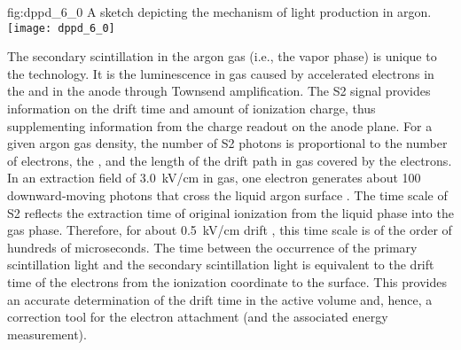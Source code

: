 \begin{dunefigure}{fig:dppd_6_0}
{A sketch depicting the mechanism of light production in argon.}
\texttt{[image: dppd\_6\_0]}
\end{dunefigure}

The secondary scintillation in the argon gas (i.e., the vapor phase) is unique to the \dpmod technology. It is the luminescence in gas caused by accelerated electrons in the \efield and in the  anode through Townsend amplification. The S2 signal provides information on the drift time and amount of ionization charge, thus supplementing information from the charge readout on the anode plane. For a given argon gas density, the number of S2 photons is proportional to the number of electrons, the \efield, and the length of the drift path in gas covered by the electrons. In an extraction field of \SI{3.0}{kV/cm} in gas, one electron generates about \num{100} downward-moving photons that cross the liquid argon surface \cite{Lux:2018zwd}. The time scale of S2 reflects the extraction time of original ionization from the liquid phase into the gas phase. Therefore, for about \SI{0.5}{kV/cm} drift \efield, this time scale is of the order of hundreds of microseconds. The time between the occurrence of the primary scintillation light and the secondary scintillation light is equivalent to the drift time of the electrons from the ionization coordinate to the \lar surface. This provides an accurate determination of the drift time in the active volume and, hence, a correction tool for the electron attachment (and the associated energy measurement).  



